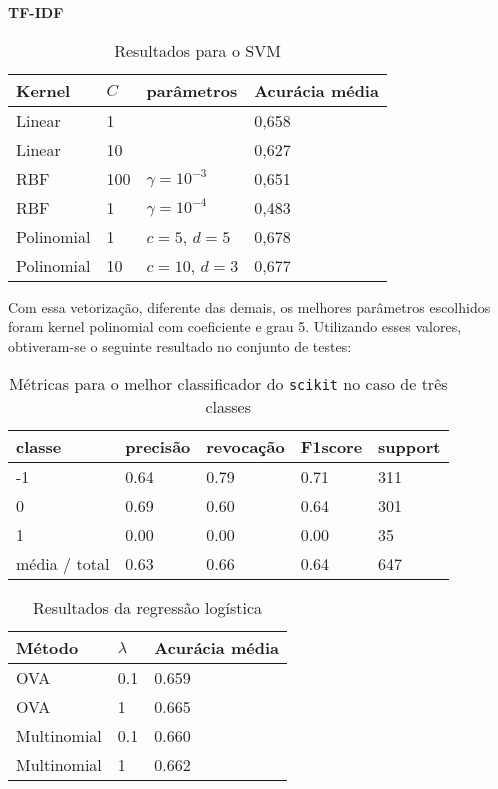 \textbf{TF-IDF}

\begin{table}[H]
	\centering
	\caption{Resultados para o SVM}
	\begin{tabular}{l l l l}
		\hline
		Kernel & $C$ & parâmetros & Acurácia média \\
		\hline
		Linear & 1 & & 0,658 \\
		\hline
		Linear & 10 & & 0,627 \\
		\hline
		RBF & 100 & $\gamma = 10^{-3}$ & 0,651 \\
		\hline
		RBF & 1 & $\gamma = 10^{-4}$ & 0,483 \\
		\hline
		Polinomial & 1 & $c = 5$, $d = 5$ & 0,678 \\
		\hline
		Polinomial & 10 & $c = 10$, $d = 3$ & 0,677 \\
		\hline
	\end{tabular}
\end{table}

Com essa vetorização, diferente das demais, os melhores parâmetros escolhidos foram kernel polinomial
com coeficiente e grau 5. Utilizando esses valores, obtiveram-se o seguinte resultado no conjunto de
testes:

\begin{table}[H]
	\centering
		\begin{tabular}{l | l | l | l | l}
		\hline
		classe  	&	precisão  &  revocação &  F1\-score &  support \\
		\hline
		 -1    &   0.64   &   0.79   &   0.71   &    311 \\
		 \hline
          0    &   0.69   &   0.60  &    0.64    &   301 \\
          \hline
          1   &    0.00   &   0.00   &   0.00    &    35 \\
          \hline
		média / total   &    0.63   &   0.66   &   0.64   &    647 \\
		\hline
	\end{tabular}
	\caption{Métricas para o melhor classificador do \texttt{scikit} no caso de três classes}
	\label{tab:best_scikit}
\end{table}

\begin{table}[H]
	\centering
	\caption{Resultados da regressão logística}
	\begin{tabular}{l l l}
		\hline
		Método & $\lambda$ & Acurácia média \\
		\hline
		OVA & 0.1 & 0.659 \\
		\hline
		OVA & 1 & 0.665 \\
		\hline
		Multinomial & 0.1 & 0.660 \\
		\hline
		Multinomial & 1 & 0.662 \\
		\hline
	\end{tabular}
\end{table}

